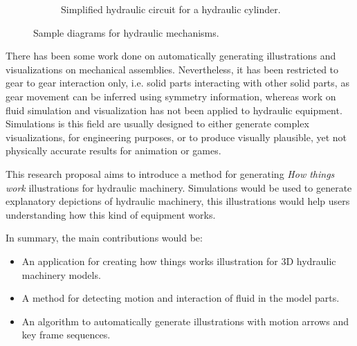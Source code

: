 \begin{figure}[htbp]
\begin{subfigure}[b]{0.4\textwidth}
                \caption{Simplified hydraulic circuit for a hydraulic cylinder.}
                \label{fig:hydraSimpleCircuit}
        \end{subfigure}
        \caption{Sample diagrams for hydraulic mechanisms.}\label{fig:HydraulicDrawings}
\end{figure}

There has been some work done on automatically generating illustrations and visualizations on mechanical assemblies.
Nevertheless, it has been restricted to gear to gear interaction only, i.e. solid parts interacting with other solid parts, as gear movement can be inferred using symmetry information, whereas work on fluid simulation and visualization has not been applied to hydraulic equipment.
Simulations is this field are usually designed to either generate complex visualizations, for engineering purposes, or to produce visually plausible, yet not physically accurate results for animation or games.

This research proposal aims to introduce a method for generating \textit{How things work} illustrations for hydraulic machinery.
Simulations would be used to generate explanatory depictions of hydraulic machinery, this illustrations would help users understanding how this kind of equipment works.

In summary, the main contributions would be:
\begin{itemize}
\item An application for creating how things works illustration for 3D hydraulic machinery models.
\item A method for detecting motion and interaction of fluid in the model parts.
\item An algorithm to automatically generate illustrations with motion arrows and key frame sequences.
\end{itemize}